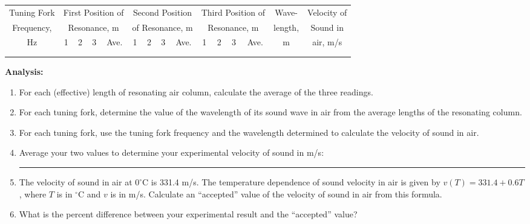 \begin{center} \begin{tabular}{||c|c|c|c|c|c|c|c|c|c|c|c|c|c|c||} \hline \hline Tuning Fork & \multicolumn{4}{|c|}{First Position of} & \multicolumn{4}{|c|}{Second Position} & \multicolumn{4}{|c|}{Third Position of} & Wave- & Velocity of \\ Frequency, & \multicolumn{4}{|c|}{Resonance, m} & \multicolumn{4}{|c|}{of Resonance, m} & \multicolumn{4}{|c|}{Resonance, m} & length, & Sound in \\ \cline{2-13} Hz & 1 & 2 & 3 & Ave. & 1 & 2 & 3 & Ave. & 1 & 2 & 3 & Ave. & m & air, m/s \\ \hline \hline &&&&&&&&&&&&&& \\ \hline &&&&&&&&&&&&&& \\ \hline \hline \end{tabular} \end{center}


{\noindent \bf Analysis:} \begin{enumerate}

\item For each (effective) length of resonating air column, calculate the average of the three readings.

\item For each tuning fork, determine the value of the wavelength of its sound wave in air from the average lengths of the resonating column.

\item For each tuning fork, use the tuning fork frequency and the wavelength determined to calculate the velocity of sound in air.

\item Average your two values to determine your experimental velocity of sound in m/s: \ \ \  \rule{2cm}{1pt}

\item The velocity of sound in air at $0^\circ$C is 331.4 m/s.  The temperature dependence of sound velocity in air is given by $v(T) = 331.4 + 0.6T$, where $T$ is in $^\circ$C and $v$ is in m/s. Calculate an ``accepted'' value of the velocity of sound in air from this formula.

\vskip35pt

\item What is the percent difference between your experimental result and the ``accepted'' value?

\end{enumerate}

